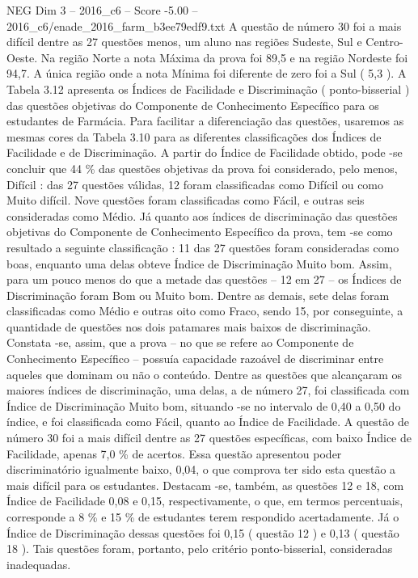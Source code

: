 \begin{textsample}{NEG Dim 3 – 2016\_c6 – Score -5.00 – 2016\_c6/enade\_2016\_farm\_b3ee79edf9.txt}
A questão de número 30 foi a mais difícil dentre as 27 questões menos, um aluno nas regiões Sudeste, Sul e Centro-Oeste.
Na região Norte a nota Máxima da prova foi 89,5 e na região Nordeste foi 94,7.
A única região onde a nota Mínima foi diferente de zero foi a Sul ( 5,3 ).
A Tabela 3.12 apresenta os Índices de Facilidade e Discriminação ( ponto-bisserial ) das questões objetivas do Componente de Conhecimento Específico para os estudantes de Farmácia.
Para facilitar a diferenciação das questões, usaremos as mesmas cores da Tabela 3.10 para as diferentes classificações dos Índices de Facilidade e de Discriminação.
A partir do Índice de Facilidade obtido, pode -se concluir que 44 \% das questões objetivas da prova foi considerado, pelo menos, Difícil : das 27 questões válidas, 12 foram classificadas como Difícil ou como Muito difícil.
Nove questões foram classificadas como Fácil, e outras seis consideradas como Médio.
Já quanto aos índices de discriminação das questões objetivas do Componente de Conhecimento Específico da prova, tem -se como resultado a seguinte classificação : 11 das 27 questões foram consideradas como boas, enquanto uma delas obteve Índice de Discriminação Muito bom.
Assim, para um pouco menos do que a metade das questões – 12 em 27 – os Índices de Discriminação foram Bom ou Muito bom.
Dentre as demais, sete delas foram classificadas como Médio e outras oito como Fraco, sendo 15, por conseguinte, a quantidade de questões nos dois patamares mais baixos de discriminação.
Constata -se, assim, que a prova – no que se refere ao Componente de Conhecimento Específico – possuía capacidade razoável de discriminar entre aqueles que dominam ou não o conteúdo.
Dentre as questões que alcançaram os maiores índices de discriminação, uma delas, a de número 27, foi classificada com Índice de Discriminação Muito bom, situando -se no intervalo de 0,40 a 0,50 do índice, e foi classificada como Fácil, quanto ao Índice de Facilidade.
A questão de número 30 foi a mais difícil dentre as 27 questões específicas, com baixo Índice de Facilidade, apenas 7,0 \% de acertos.
Essa questão apresentou poder discriminatório igualmente baixo, 0,04, o que comprova ter sido esta questão a mais difícil para os estudantes.
Destacam -se, também, as questões 12 e 18, com Índice de Facilidade 0,08 e 0,15, respectivamente, o que, em termos percentuais, corresponde a 8 \% e 15 \% de estudantes terem respondido acertadamente.
Já o Índice de Discriminação dessas questões foi 0,15 ( questão 12 ) e 0,13 ( questão 18 ).
Tais questões foram, portanto, pelo critério ponto-bisserial, consideradas inadequadas.

\end{textsample}
